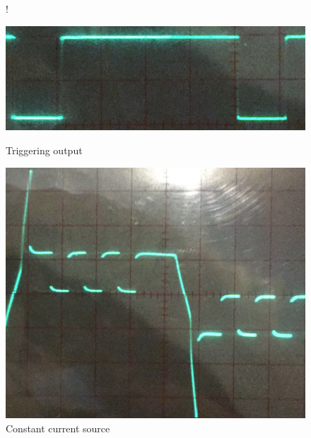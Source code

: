 \documentclass{beamer}
\begin{document}
\begin{frame}
		\begin{figure}
			 {!} {
			  \centering
			  \begin{minipage}[b]{0.4\textwidth}
			    \includegraphics[width=\textwidth]{../chapters/hardware-chapters/triggering-circuit-output-cropped.png}
			    \caption{Triggering output}
			  \end{minipage}
			  \hfill
			  \begin{minipage}[b]{0.4\textwidth}
			    \includegraphics[width=\textwidth]{../chapters/hardware-chapters/current-source-measurement-cropped.png}
			    \caption{Constant current source}
			  \end{minipage}
		  }
		\end{figure}
		
		
	\end{frame}
\end{document}
